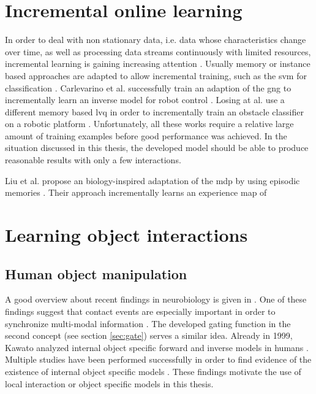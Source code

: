 \section{Incremental online learning}

In order to deal with non stationary data, i.e. data whose characteristics change over time, as well as processing data streams continuously with limited resources, incremental learning is gaining increasing attention \cite{polikar2014guest}. Usually memory or instance based approaches are adapted to allow incremental training, such as the \gls{svm} for classification \cite{diehl2003svm}. Carlevarino et al. successfully train an adaption of the \gls{gng} to incrementally learn an inverse model for robot control \cite{carlevarino2000incremental}. 
Losing at al. use a different memory based \gls{lvq} in order to incrementally train an obstacle classifier on a robotic platform \cite{losing2015interactive}.
Unfortunately, all these works require a relative large amount of training examples before good performance was achieved. In the situation discussed in this thesis, the developed model should be able to produce reasonable results with only a few interactions.

Liu et al. propose an biology-inspired adaptation of the \gls{mdp} by using episodic memories \cite{liu2015robotic, roboticEpisodes}. Their approach incrementally learns an experience map of


\section{Learning object interactions}

\subsection{Human object manipulation}

A good overview about recent findings in neurobiology is given in \cite{flanagan2006control}. One of these findings suggest that contact events are especially important in order to synchronize multi-modal information \cite{johansson2001eye}. The developed gating function in the second concept (see section \ref{sec:gate}) serves a similar idea. 
Already in 1999, Kawato analyzed internal object specific forward and inverse models in humans \cite{kawato1999internal}. Multiple studies have been performed successfully in order to find evidence of the existence of internal object specific models \cite{flanagan2001sensorimotor, merfeld1999humans}.
These findings motivate the use of local interaction or object specific models in this thesis.

